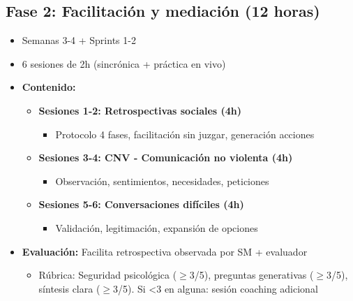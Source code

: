 \subsection*{Fase 2: Facilitación y mediación (12 horas)}
\begin{itemize}
    \item Semanas 3-4 + Sprints 1-2
    \item 6 sesiones de 2h (sincrónica + práctica en vivo)
    \item \textbf{Contenido:}
          \begin{itemize}
              \item \textbf{Sesiones 1-2: Retrospectivas sociales (4h)}
                    \begin{itemize}
                        \item Protocolo 4 fases, facilitación sin juzgar, generación acciones
                    \end{itemize}
              \item \textbf{Sesiones 3-4: CNV - Comunicación no violenta (4h)}
                    \begin{itemize}
                        \item Observación, sentimientos, necesidades, peticiones
                    \end{itemize}
              \item \textbf{Sesiones 5-6: Conversaciones difíciles (4h)}
                    \begin{itemize}
                        \item Validación, legitimación, expansión de opciones
                    \end{itemize}
          \end{itemize}
    \item \textbf{Evaluación:} Facilita retrospectiva observada por SM + evaluador
          \begin{itemize}
              \item Rúbrica: Seguridad psicológica ($\geq$3/5), preguntas generativas ($\geq$3/5), síntesis clara ($\geq$3/5). Si <3 en alguna: sesión coaching adicional
          \end{itemize}
\end{itemize}


